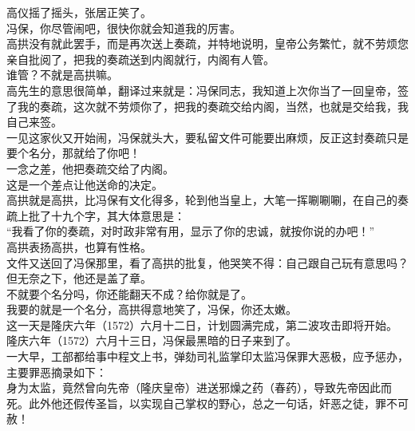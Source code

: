 \begin{multicols}{\theparacolNo}
高仪摇了摇头，张居正笑了。\\

冯保，你尽管闹吧，很快你就会知道我的厉害。\\

高拱没有就此罢手，而是再次送上奏疏，并特地说明，皇帝公务繁忙，就不劳烦您亲自批阅了，把我的奏疏送到内阁就行，内阁有人管。\\

谁管？不就是高拱嘛。\\

高先生的意思很简单，翻译过来就是：冯保同志，我知道上次你当了一回皇帝，签了我的奏疏，这次就不劳烦你了，把我的奏疏交给内阁，当然，也就是交给我，我自己来签。\\

一见这家伙又开始闹，冯保就头大，要私留文件可能要出麻烦，反正这封奏疏只是要个名分，那就给了你吧！\\

一念之差，他把奏疏交给了内阁。\\

这是一个差点让他送命的决定。\\

高拱就是高拱，比冯保有文化得多，轮到他当皇上，大笔一挥唰唰唰，在自己的奏疏上批了十九个字，其大体意思是：\\

“我看了你的奏疏，对时政非常有用，显示了你的忠诚，就按你说的办吧！”\\

高拱表扬高拱，也算有性格。\\

文件又送回了冯保那里，看了高拱的批复，他哭笑不得：自己跟自己玩有意思吗？但无奈之下，他还是盖了章。\\

不就要个名分吗，你还能翻天不成？给你就是了。\\

我要的就是一个名分，高拱得意地笑了，冯保，你还太嫩。\\

这一天是隆庆六年（1572）六月十二日，计划圆满完成，第二波攻击即将开始。\\

隆庆六年（1572）六月十三日，冯保最黑暗的日子来到了。\\

一大早，工部都给事中程文上书，弹劾司礼监掌印太监冯保罪大恶极，应予惩办，主要罪恶摘录如下：\\

身为太监，竟然曾向先帝（隆庆皇帝）进送邪燥之药（春药），导致先帝因此而死。此外他还假传圣旨，以实现自己掌权的野心，总之一句话，奸恶之徒，罪不可赦！\\


\end{multicols}
